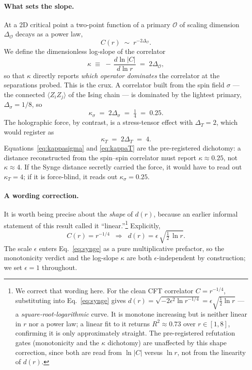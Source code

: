 \documentclass[11pt]{article}
\begin{document}
\paragraph{What sets the slope.}
At a 2D critical point a two-point function of a primary $\mathcal{O}$ of scaling dimension
$\Delta_{\mathcal{O}}$ decays as a power law,
\begin{equation}
  C(r)\;\sim\;r^{-2\Delta_{\mathcal{O}}}.
  \label{eq:cft}
\end{equation}
We define the dimensionless log-slope of the correlator
\begin{equation}
  \kappa \;\equiv\; -\,\frac{d\ln|C|}{d\ln r}\;=\;2\Delta_{\mathcal{O}},
  \label{eq:kappa}
\end{equation}
so that $\kappa$ directly reports \emph{which operator dominates} the correlator at the
separations probed. This is the crux. A correlator built from the spin field $\sigma$ ---
the connected $\langle Z_iZ_j\rangle$ of the Ising chain --- is dominated by the lightest
primary, $\Delta_\sigma=1/8$, so
\begin{equation}
  \kappa_\sigma \;=\; 2\Delta_\sigma \;=\; \tfrac14 \;=\; 0.25 .
  \label{eq:kappasigma}
\end{equation}
The holographic force, by contrast, is a stress-tensor effect with $\Delta_T=2$, which would
register as
\begin{equation}
  \kappa_T \;=\; 2\Delta_T \;=\; 4 .
  \label{eq:kappaT}
\end{equation}
Equations~\eqref{eq:kappasigma} and \eqref{eq:kappaT} are the pre-registered dichotomy: a
distance reconstructed from the spin--spin correlator must report $\kappa\approx0.25$, not
$\kappa\approx4$. If the Synge distance secretly carried the force, it would have to read out
$\kappa_T=4$; if it is force-blind, it reads out $\kappa_\sigma=0.25$.

\paragraph{A wording correction.}
It is worth being precise about the \emph{shape} of $d(r)$, because an earlier informal
statement of this result called it ``linear.''\footnote{We correct that wording here. For the
clean CFT correlator $C=r^{-1/4}$, substituting into Eq.~\eqref{eq:synge} gives
$d(r)=\sqrt{-2\epsilon^{2}\ln r^{-1/4}}=\epsilon\sqrt{\tfrac12\ln r}$ --- a
\emph{square-root-logarithmic} curve. It is monotone increasing but is neither linear in $r$
nor a power law; a linear fit to it returns $R^{2}\approx0.73$ over $r\in[1,8]$, confirming
it is only approximately straight. The pre-registered refutation gates (monotonicity and the
$\kappa$ dichotomy) are unaffected by this shape correction, since both are read from
$\ln|C|$ versus $\ln r$, not from the linearity of $d(r)$.}
Explicitly,
\begin{equation}
  C(r)=r^{-1/4}\;\;\Longrightarrow\;\;
  d(r)=\epsilon\,\sqrt{\tfrac12\,\ln r}.
  \label{eq:sqrtlog}
\end{equation}
The scale $\epsilon$ enters Eq.~\eqref{eq:synge} as a pure multiplicative prefactor, so the
monotonicity verdict and the log-slope $\kappa$ are both $\epsilon$-independent by
construction; we set $\epsilon=1$ throughout.
\end{document}
